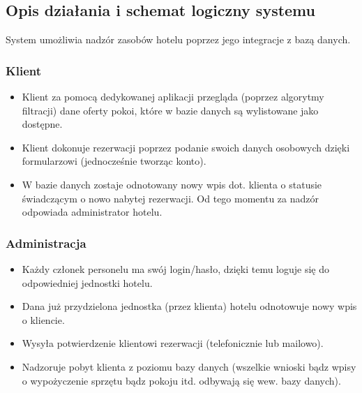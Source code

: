 \documentclass[]{article}
\begin{document}
	\subsection{Opis działania i schemat logiczny systemu}
	System umożliwia nadzór zasobów hotelu poprzez jego integracje z bazą danych.
	\subsubsection{Klient}
	\begin{itemize}
	\item Klient za pomocą dedykowanej aplikacji przegląda (poprzez algorytmy filtracji) dane oferty pokoi, które w bazie danych są wylistowane jako dostępne.
	\item Klient dokonuje rezerwacji poprzez podanie swoich danych osobowych dzięki formularzowi (jednocześnie tworząc konto).
	\item W bazie danych zostaje odnotowany nowy wpis dot. klienta o statusie świadczącym o nowo nabytej rezerwacji. Od tego momentu za nadzór odpowiada administrator hotelu.
	\end{itemize}  
	\subsubsection{Administracja}	
	\begin{itemize}
		\item Każdy członek personelu ma swój login/hasło, dzięki temu loguje się do odpowiedniej jednostki hotelu.
		\item Dana już przydzielona jednostka (przez klienta) hotelu odnotowuje nowy wpis o kliencie.
		\item Wysyła potwierdzenie klientowi rezerwacji (telefonicznie lub mailowo).
		\item Nadzoruje pobyt klienta z poziomu bazy danych (wszelkie wnioski bądz wpisy o wypożyczenie sprzętu bądz pokoju itd. odbywają się wew. bazy danych).
	\end{itemize}
\newpage
\end{document}
